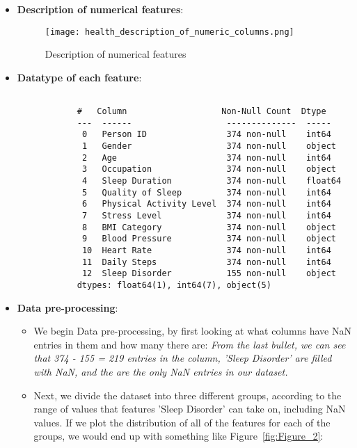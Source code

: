 \documentclass{article}
\begin{document}
\begin{enumerate}
\begin{itemize}
\begin{itemize}
\begin{verbatim}
            \end{verbatim}

        \end{itemize}

        \newpage
        \item \textbf{Description of numerical features}:
        \begin{figure}[H]  %

            \centering
            \texttt{[image: health\_description\_of\_numeric\_columns.png]}  %
            \caption{Description of numerical features}
            \label{fig:Figure_1}  %
        \end{figure}

        \item \textbf{Datatype of each feature}:
        \begin{verbatim}

            #   Column                   Non-Null Count  Dtype  
            ---  ------                   --------------  -----  
             0   Person ID                374 non-null    int64  
             1   Gender                   374 non-null    object 
             2   Age                      374 non-null    int64  
             3   Occupation               374 non-null    object 
             4   Sleep Duration           374 non-null    float64
             5   Quality of Sleep         374 non-null    int64  
             6   Physical Activity Level  374 non-null    int64  
             7   Stress Level             374 non-null    int64  
             8   BMI Category             374 non-null    object 
             9   Blood Pressure           374 non-null    object 
             10  Heart Rate               374 non-null    int64  
             11  Daily Steps              374 non-null    int64  
             12  Sleep Disorder           155 non-null    object 
            dtypes: float64(1), int64(7), object(5)

        \end{verbatim}

        \item \textbf{Data pre-processing}:
        \begin{itemize}
            
            \item We begin Data pre-processing, by first looking at what columns have NaN entries in them and how many there are:
            \textit{From the last bullet, we can see that 374 - 155 = 219 entries in the column, 'Sleep Disorder' are filled with NaN, and the are the only NaN entries in our dataset.} 
            \item Next, we divide the dataset into three different groups, according to the range of values that features 'Sleep Disorder' can take on, including NaN values. If we plot the distribution of all of the features for each of the groups, 
            we would end up with something like Figure~\ref{fig:Figure_2}:
             

\end{itemize}
\end{itemize}
\end{enumerate}
\end{document}
